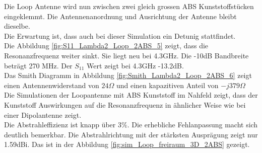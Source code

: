 Die Loop Antenne wird nun zwischen zwei gleich grossen ABS Kunststoffstücken eingeklemmt. Die Antennenanordnung und Ausrichtung der Antenne bleibt dieselbe. \\
Die Erwartung ist, dass auch bei dieser Simulation ein Detunig stattfindet.\\ 

Die Abbildung \ref{fig:S11_Lambda2_Loop_2ABS_5} zeigt, dass die Resonanzfrequenz weiter sinkt. Sie liegt neu bei 4.3GHz. Die -10dB Bandbreite beträgt 270 MHz. Der $S_{11}$ Wert zeigt bei 4.3GHz -13.2dB.\\
Das Smith Diagramm in Abbildung \ref{fig:Smith_Lambda2_Loop_2ABS_6} zeigt einen Antennenwiderstand von $24\Omega$ und einen kapazitiven Anteil von $-j379\Omega$\\
Die Simulationen der Loopantenne mit ABS Kunststoff im Nahfeld zeigt, dass der Kunststoff Auswirkungen auf die Resonanzfrequenz in ähnlicher Weise wie bei einer Dipolantenne zeigt.\\
Die Abstrahleffizienz ist knapp über $3\%$. Die erhebliche Fehlanpassung macht sich deutlich bemerkbar. Die Abstrahlrichtung mit der stärksten Ausprägung zeigt nur 1.59dBi. Das ist in der Abbildung \ref{fig:sim_Loop_freiraum_3D_2ABS} gezeigt.
